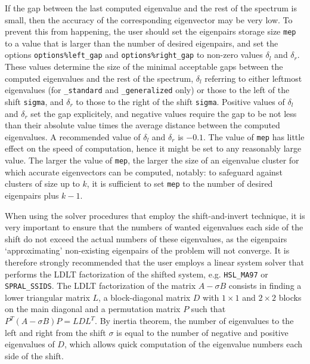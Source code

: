 \documentclass{spral}
\begin{document}
If the gap %
between the last computed eigenvalue 
and the rest of the spectrum is small,
then the accuracy of the corresponding eigenvector may be very low.
To prevent this from happening,
the user should set the eigenpairs storage size {\tt mep}
to a value that is larger than the number of desired eigenpairs,
and set the options 
{\tt options\%left\_gap}
and
{\tt options\%right\_gap}
to non-zero values $\delta_l$ and $\delta_r$.
These values
determine the size of the minimal acceptable gaps
between the computed eigenvalues and the rest of the spectrum,
$\delta_l$ referring to either leftmost eigenvalues
(for {\tt \solver\_standard} and {\tt \solver\_generalized} only)
or those to the left of the shift {\tt sigma},
and $\delta_r$
to those to the right of the shift {\tt sigma}.
Positive values of $\delta_l$ and $\delta_r$
set the gap explicitely,
and negative values
require the gap to be not less than their absolute value times
the average distance between the computed eigenvalues.
A recommended value of $\delta_l$ and $\delta_r$ is $-0.1$.
The value of {\tt mep} %
has little effect on
the speed of computation,
hence it might be set to any reasonably large value.
The larger the value of {\tt mep}, 
the larger the size of an eigenvalue cluster
for which accurate eigenvectors can be computed, notably:
to safeguard against clusters of size up to $k$,
it is sufficient to set {\tt mep} to the number of desired eigenpairs
plus $k - 1$.

When using the solver procedures that employ the shift-and-invert technique,
it is very important to ensure that the numbers of wanted eigenvalues
each side of the shift do not exceed the actual numbers of these eigenvalues,
as the eigenpairs `approximating' non-existing eigenpairs of the problem
will not converge.
It is therefore strongly recommended that the user employs 
a linear system solver that performs
the LDLT
factorization of %
the shifted system,
e.g. {\tt HSL\_MA97} or {\tt SPRAL\_SSIDS}.
The LDLT factorization of the matrix
$A - \sigma B$ consists in finding a lower triangular
matrix $L$, a block-diagonal matrix $D$
with $1\times 1$ and $2\times 2$ blocks on the main diagonal
and a permutation matrix $P$
such that $P^T(A - \sigma B)P = L D L^T$.
By inertia theorem,
the number of eigenvalues to the left and right from 
the shift $\sigma$
is equal to the number of negative and positive eigenvalues of $D$,
which allows quick computation of the eigenvalue numbers
each side of the shift. %
\end{document}
